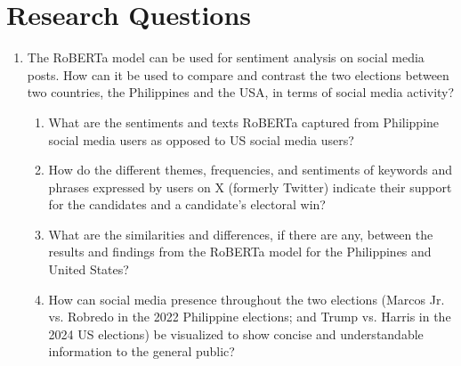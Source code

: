 \section{Research Questions}

\begin{enumerate}
    \item The RoBERTa model can be used for sentiment analysis on social media posts. How can it be used to compare and contrast the two elections between two countries, the Philippines and the USA, in terms of social media activity?
    \begin{enumerate}
        \item What are the sentiments and texts RoBERTa captured from Philippine social media users as opposed to US social media users?
        \item How do the different themes, frequencies, and sentiments of keywords and phrases expressed by users on X (formerly Twitter) indicate their support for the candidates and a candidate's electoral win?
        \item What are the similarities and differences, if there are any, between the results and findings from the RoBERTa model for the Philippines and United States?
        \item How can social media presence throughout the two elections (Marcos Jr. vs. Robredo in the 2022 Philippine elections; and Trump vs. Harris in the 2024 US elections) be visualized to show concise and understandable information to the general public?
    \end{enumerate}
\end{enumerate}